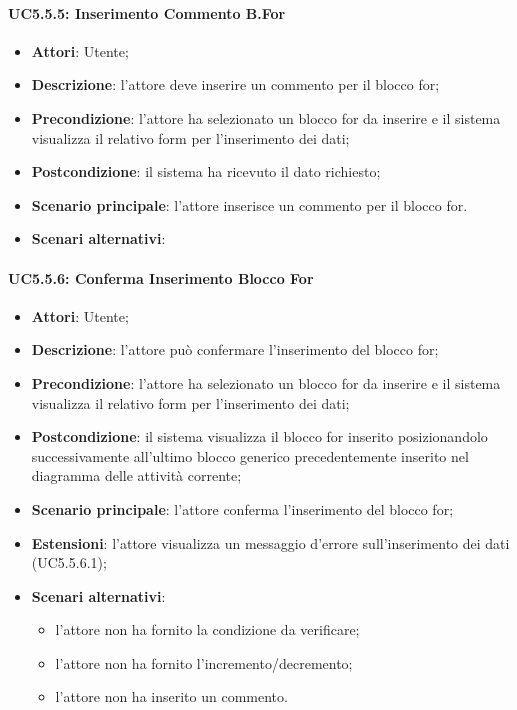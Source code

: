 \paragraph{UC5.5.5: Inserimento Commento B.For	}
\label{UC5.5.5}
\begin{itemize}
\item \textbf{Attori}: Utente;
\item \textbf{Descrizione}: l'attore deve inserire un commento per il blocco for;	
\item \textbf{Precondizione}: l'attore ha selezionato un blocco for da inserire e il sistema visualizza il relativo form per l'inserimento dei dati;	
\item \textbf{Postcondizione}: il sistema ha ricevuto il dato richiesto;	
\item \textbf{Scenario principale}:
l'attore inserisce un commento per il blocco for.	
\item \textbf{Scenari alternativi}:
\end{itemize}

\paragraph{UC5.5.6: Conferma Inserimento Blocco For}
\label{UC5.5.6}
\begin{itemize}
\item \textbf{Attori}: Utente;
\item \textbf{Descrizione}: l'attore può confermare l'inserimento del blocco for;	
\item \textbf{Precondizione}: l'attore ha selezionato un blocco for da inserire e il sistema visualizza il relativo form per l'inserimento dei dati;	
\item \textbf{Postcondizione}: il sistema visualizza il blocco for inserito posizionandolo successivamente all'ultimo blocco generico precedentemente inserito nel diagramma delle attività corrente;
\item \textbf{Scenario principale}:
l'attore conferma l'inserimento del blocco for;	
\item \textbf{Estensioni}:
l'attore visualizza un messaggio d'errore sull'inserimento dei dati (UC5.5.6.1);	
\item \textbf{Scenari alternativi}:
\begin{itemize}
\item l'attore non ha fornito la condizione da verificare;
\item l'attore non ha fornito l'incremento/decremento;
\item l'attore non ha inserito un commento.
\end{itemize}
\end{itemize}

